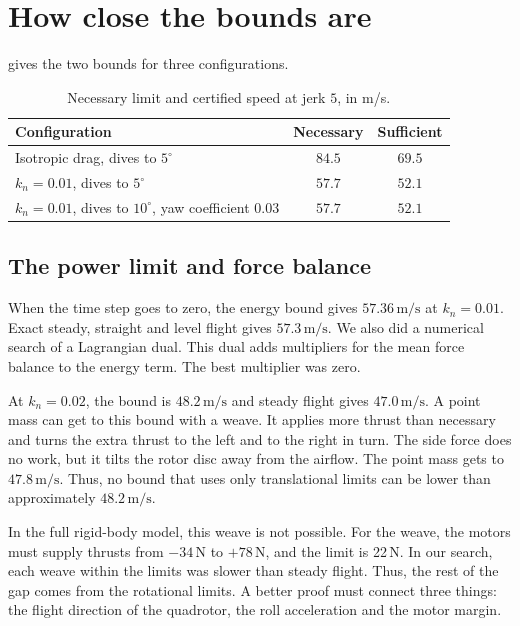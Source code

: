 \documentclass[11pt]{article}
\theoremstyle{definition}
\newcommand{\ms}{\,\mathrm{m/s}}
\begin{document}
\section{How close the bounds are}

 gives the two bounds for three configurations.

\begin{table}[h]
\centering
\caption{Necessary limit and certified speed at jerk $5$, in m/s.}
\label{tab:tight}
\begin{tabular}{@{}lcc@{}}
\toprule
Configuration & Necessary & Sufficient \\
\midrule
Isotropic drag, dives to $5^\circ$ & $84.5$ & $69.5$ \\
$k_n = 0.01$, dives to $5^\circ$ & $57.7$ & $52.1$ \\
$k_n = 0.01$, dives to $10^\circ$, yaw coefficient $0.03$ & $57.7$ & $52.1$ \\
\bottomrule
\end{tabular}
\end{table}

\subsection{The power limit and force balance}

When the time step goes to zero, the energy bound gives $57.36\ms$ at $k_n = 0.01$.
Exact steady, straight and level flight gives $57.3\ms$.
We also did a numerical search of a Lagrangian dual.
This dual adds multipliers for the mean force balance to the energy term.
The best multiplier was zero.

At $k_n = 0.02$, the bound is $48.2\ms$ and steady flight gives $47.0\ms$.
A point mass can get to this bound with a weave.
It applies more thrust than necessary and turns the extra thrust to the left and to the right in
turn.
The side force does no work, but it tilts the rotor disc away from the airflow.
The point mass gets to $47.8\ms$.
Thus, no bound that uses only translational limits can be lower than approximately $48.2\ms$.

In the full rigid-body model, this weave is not possible.
For the weave, the motors must supply thrusts from $-34$\,N to $+78$\,N, and the limit is 22\,N.
In our search, each weave within the limits was slower than steady flight.
Thus, the rest of the gap comes from the rotational limits.
A better proof must connect three things: the flight direction of the quadrotor, the roll acceleration and
the motor margin.
\end{document}
